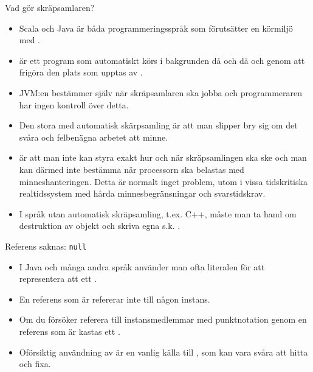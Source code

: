 \begin{Slide}{Vad gör skräpsamlaren?}\SlideFontSmall
\begin{itemize}
\item Scala och Java är båda programmeringsspråk som förutsätter en körmiljö med    .

\item {}  är ett program som automatiskt körs i bakgrunden då och då och  genom att frigöra den plats som upptas av .

\item JVM:en bestämmer själv när skräpsamlaren ska jobba och programmeraren har ingen kontroll över detta.

\item Den stora  med automatisk skärpsamling är att man slipper bry sig om det svåra och felbenägna arbetet att  minne.

\item {} är att man inte kan styra exakt hur och när skräpsamlingen ska ske och man kan därmed inte bestämma när processorn ska belastas med minneshanteringen. Detta är normalt inget problem, utom i vissa tidskritiska realtidssystem med hårda minnesbegränsningar och svarstidskrav.

\item I språk utan automatisk skräpsamling, t.ex. C++, måste man ta hand om destruktion av objekt och skriva egna s.k. .
\end{itemize}
\end{Slide}



\begin{Slide}{Referens saknas: \texttt{null}}
\begin{itemize}
\item I Java och många andra språk använder man ofta literalen  för att representera att ett .

\item En referens som är  refererar inte till någon instans.

\item Om du försöker referera till instansmedlemmar med punktnotation genom en referens som är  kastas ett  .

\item Oförsiktig användning av  är en vanlig källa till , som kan vara svåra att hitta och fixa.

\end{itemize}
\end{Slide}



